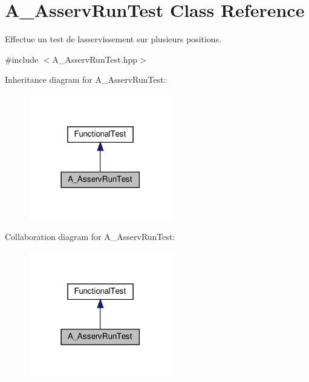 \hypertarget{classA__AsservRunTest}{}\section{A\+\_\+\+Asserv\+Run\+Test Class Reference}
\label{classA__AsservRunTest}


Effectue un test de l\textquotesingle{}asservissement sur plusieurs positions.  




{\ttfamily \#include $<$A\+\_\+\+Asserv\+Run\+Test.\+hpp$>$}



Inheritance diagram for A\+\_\+\+Asserv\+Run\+Test\+:
\nopagebreak
\begin{figure}[H]
\begin{center}
\leavevmode
\includegraphics[width=177pt]{classA__AsservRunTest__inherit__graph}
\end{center}
\end{figure}


Collaboration diagram for A\+\_\+\+Asserv\+Run\+Test\+:
\nopagebreak
\begin{figure}[H]
\begin{center}
\leavevmode
\includegraphics[width=177pt]{classA__AsservRunTest__coll__graph}
\end{center}
\end{figure}
